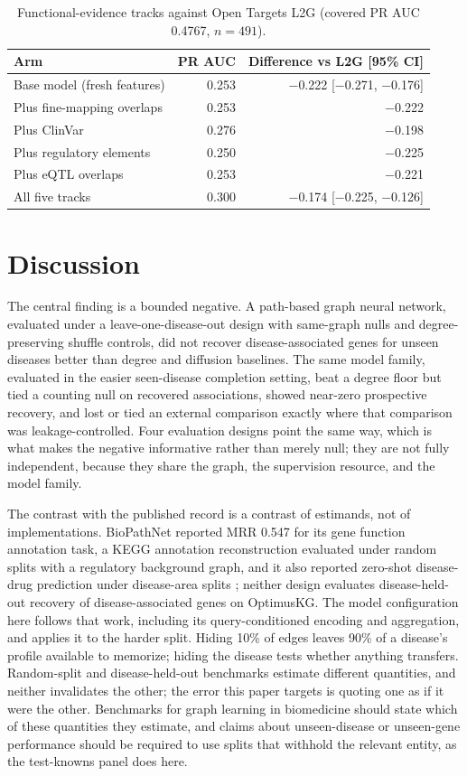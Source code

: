 \documentclass[11pt]{article}
\begin{document}
\begin{table}[t]
\centering
\small
\caption{Functional-evidence tracks against Open Targets L2G (covered PR AUC 0.4767, $n = 491$).}
\label{tab:m5b}
\begin{tabularx}{\textwidth}{@{}L r r@{}}
\toprule
\textbf{Arm} & \textbf{PR AUC} & \textbf{Difference vs L2G [95\% CI]} \\
\midrule
Base model (fresh features) & 0.253 & $-$0.222 [$-$0.271, $-$0.176] \\
Plus fine-mapping overlaps & 0.253 & $-$0.222 \\
Plus ClinVar & 0.276 & $-$0.198 \\
Plus regulatory elements & 0.250 & $-$0.225 \\
Plus eQTL overlaps & 0.253 & $-$0.221 \\
All five tracks & 0.300 & $-$0.174 [$-$0.225, $-$0.126] \\
\bottomrule
\end{tabularx}
\end{table}

\section{Discussion}

The central finding is a bounded negative. A path-based graph neural network, evaluated under a leave-one-disease-out design with same-graph nulls and degree-preserving shuffle controls, did not recover disease-associated genes for unseen diseases better than degree and diffusion baselines. The same model family, evaluated in the easier seen-disease completion setting, beat a degree floor but tied a counting null on recovered associations, showed near-zero prospective recovery, and lost or tied an external comparison exactly where that comparison was leakage-controlled. Four evaluation designs point the same way, which is what makes the negative informative rather than merely null; they are not fully independent, because they share the graph, the supervision resource, and the model family.

The contrast with the published record is a contrast of estimands, not of implementations. BioPathNet reported MRR 0.547 for its gene function annotation task, a KEGG annotation reconstruction evaluated under random splits with a regulatory background graph, and it also reported zero-shot disease-drug prediction under disease-area splits \cite{hu2026}; neither design evaluates disease-held-out recovery of disease-associated genes on OptimusKG. The model configuration here follows that work, including its query-conditioned encoding and aggregation, and applies it to the harder split. Hiding 10\% of edges leaves 90\% of a disease's profile available to memorize; hiding the disease tests whether anything transfers. Random-split and disease-held-out benchmarks estimate different quantities, and neither invalidates the other; the error this paper targets is quoting one as if it were the other. Benchmarks for graph learning in biomedicine should state which of these quantities they estimate, and claims about unseen-disease or unseen-gene performance should be required to use splits that withhold the relevant entity, as the test-knowns panel does here.
\end{document}
